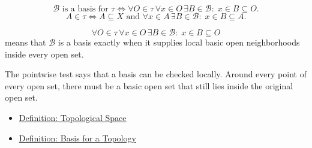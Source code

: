 \begin{remark*}
\[
\mathcal{B}\text{ is a basis for }\tau
\Longleftrightarrow
\forall O\in\tau\,\forall x\in O\,\exists B\in\mathcal{B}{:}\;
x\in B\subseteq O.
\]
\[
A\in\tau
\Longleftrightarrow
A\subseteq X
\text{ and }
\forall x\in A\,\exists B\in\mathcal{B}{:}\;
x\in B\subseteq A.
\]
\end{remark*}

\begin{remark*}
\[
\forall O\in\tau\,\forall x\in O\,\exists B\in\mathcal{B}{:}\;
x\in B\subseteq O
\]
means that \(\mathcal{B}\) is a basis exactly when it supplies local basic
open neighborhoods inside every open set.
\end{remark*}

\begin{remark*}[Interpretation]
The pointwise test says that a basis can be checked locally.  Around every
point of every open set, there must be a basic open set that still lies inside
the original open set.
\end{remark*}

\begin{dependencies}
\begin{itemize}
  \item \hyperref[def:topological-space]{Definition: Topological Space}
  \item \hyperref[def:topological-basis]{Definition: Basis for a Topology}
\end{itemize}
\end{dependencies}
